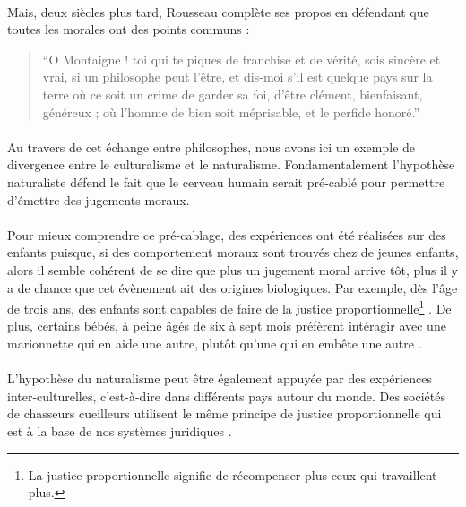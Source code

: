 \documentclass[10pt, french, a4paper]{report}
\begin{document}
\paragraph{}
Mais, deux siècles plus tard, Rousseau complète ses propos en défendant que toutes les morales ont des points communs :

\begin{quotation}
  ``O Montaigne ! toi qui te piques de franchise et de vérité, sois sincère et vrai, si un philosophe peut l’être, et dis-moi s’il est quelque pays sur la terre où ce soit un crime de garder sa foi, d’être clément, bienfaisant, généreux ; où l’homme de bien soit méprisable, et le perfide honoré.''
\end{quotation} 

\paragraph{}
Au travers de cet échange entre philosophes, nous avons ici un exemple de divergence entre le culturalisme et le naturalisme. Fondamentalement l'hypothèse naturaliste défend le fait que le cerveau humain serait pré-cablé pour permettre d'émettre des jugements moraux.

\paragraph{}
Pour mieux comprendre ce pré-cablage, des expériences ont été réalisées sur des enfants puisque, si des comportement moraux sont trouvés chez de jeunes enfants, alors il semble cohérent de se dire que plus un jugement moral arrive tôt, plus il y a de chance que cet évènement ait des origines biologiques. Par exemple, dès l'âge de trois ans, des enfants sont capables de faire de la justice proportionnelle\footnote{La justice proportionnelle signifie de récompenser plus ceux qui travaillent plus.} \citep{baumard_preschoolers_2012}. De plus, certains bébés, à peine âgés de six à sept mois préfèrent intéragir avec une marionnette qui en aide une autre, plutôt qu'une qui en embête une autre \citep{hamlin_social_2007}.

\paragraph{}
L'hypothèse du naturalisme peut être également appuyée par des expériences inter-culturelles, c'est-à-dire dans différents pays autour du monde. Des sociétés de chasseurs cueilleurs utilisent le même principe de justice proportionnelle qui est à la base de nos systèmes juridiques \citep{gurven_give_2004}.
\end{document}
